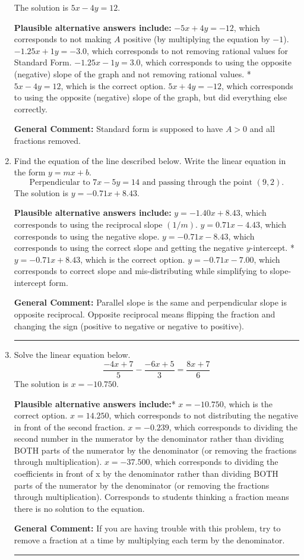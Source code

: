 \documentclass{extbook}[14pt]
\newcommand{\litem}[1]{\item #1

\rule{\textwidth}{0.4pt}}
\begin{document}
\begin{enumerate}
{The solution is \( 5x - 4y = 12 \).\begin{enumerate}[label=\Alph*.]
\textbf{Plausible alternative answers include:} $-5x + 4y = -12$, which corresponds to not making $A$ positive (by multiplying the equation by $-1$).
 $-1.25x + 1y = -3.0$, which corresponds to not removing rational values for Standard Form.
 $-1.25x - 1y = 3.0$, which corresponds to using the opposite (negative) slope of the graph and not removing rational values.
* $5x - 4y = 12$, which is the correct option.
 $5x + 4y = -12$, which corresponds to using the opposite (negative) slope of the graph, but did everything else correctly.
\end{enumerate}

\textbf{General Comment:} Standard form is supposed to have $A > 0$ and all fractions removed.
}
\litem{
Find the equation of the line described below. Write the linear equation in the form $y=mx+b$.
\[ \text{Perpendicular to } 7 x - 5 y = 14 \text{ and passing through the point } (9, 2). \]The solution is \( y = -0.71x + 8.43 \).\begin{enumerate}[label=\Alph*.]
\textbf{Plausible alternative answers include:} $y = -1.40x + 8.43$, which corresponds to using the reciprocal slope $(1/m)$.
 $y = 0.71x - 4.43$, which corresponds to using the negative slope.
 $y = -0.71x - 8.43$, which corresponds to using the correct slope and getting the negative $y$-intercept.
* $y = -0.71x + 8.43$, which is the correct option.
 $y = -0.71x - 7.00$, which corresponds to correct slope and mis-distributing while simplifying to slope-intercept form.
\end{enumerate}

\textbf{General Comment:} Parallel slope is the same and perpendicular slope is opposite reciprocal. Opposite reciprocal means flipping the fraction and changing the sign (positive to negative or negative to positive).
}
\litem{
Solve the linear equation below.
\[ \frac{-4x + 7}{5} - \frac{-6x + 5}{3} = \frac{8x + 7}{6} \]The solution is \( x = -10.750 \).\begin{enumerate}[label=\Alph*.]
\textbf{Plausible alternative answers include:}* $x = -10.750$, which is the correct option.
 $x = 14.250$, which corresponds to not distributing the negative in front of the second fraction.
 $x = -0.239$, which corresponds to dividing the second number in the numerator by the denominator rather than dividing BOTH parts of the numerator by the denominator (or removing the fractions through multiplication).
 $x = -37.500$, which corresponds to dividing the coefficients in front of x by the denominator rather than dividing BOTH parts of the numerator by the denominator (or removing the fractions through multiplication).
Corresponds to students thinking a fraction means there is no solution to the equation.
\end{enumerate}

\textbf{General Comment:} If you are having trouble with this problem, try to remove a fraction at a time by multiplying each term by the denominator.
}
\end{enumerate}
\end{document}

